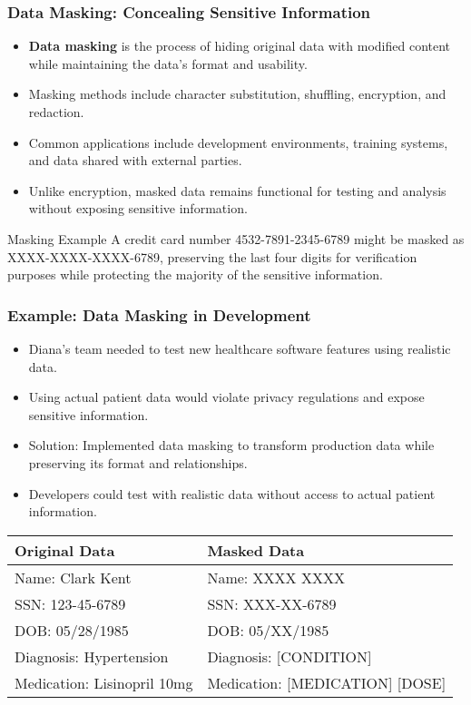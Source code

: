 \documentclass{beamer}
\begin{document}
\begin{frame}
\frametitle{Data Masking: Concealing Sensitive Information}
\begin{itemize}
    \item \textbf{Data masking} is the process of hiding original data with modified content while maintaining the data's format and usability.
    \item Masking methods include character substitution, shuffling, encryption, and redaction.
    \item Common applications include development environments, training systems, and data shared with external parties.
    \item Unlike encryption, masked data remains functional for testing and analysis without exposing sensitive information.
\end{itemize}

\begin{exampleblock}{Masking Example}
A credit card number 4532-7891-2345-6789 might be masked as XXXX-XXXX-XXXX-6789, preserving the last four digits for verification purposes while protecting the majority of the sensitive information.
\end{exampleblock}
\end{frame}

\begin{frame}
    \frametitle{Example: Data Masking in Development}
    \begin{itemize}
        \item Diana's team needed to test new healthcare software features using realistic data.
        \item Using actual patient data would violate privacy regulations and expose sensitive information.
        \item Solution: Implemented data masking to transform production data while preserving its format and relationships.
        \item Developers could test with realistic data without access to actual patient information.
    \end{itemize}
    
    \begin{table}
    \begin{tabular}{|l|l|}
    \hline
    \textbf{Original Data} & \textbf{Masked Data} \\
    \hline
    Name: Clark Kent & Name: XXXX XXXX \\
    \hline
    SSN: 123-45-6789 & SSN: XXX-XX-6789 \\
    \hline
    DOB: 05/28/1985 & DOB: 05/XX/1985 \\
    \hline
    Diagnosis: Hypertension & Diagnosis: [CONDITION] \\
    \hline
    Medication: Lisinopril 10mg & Medication: [MEDICATION] [DOSE] \\
    \hline
    \end{tabular}
    \end{table}
    \end{frame}
\end{document}
